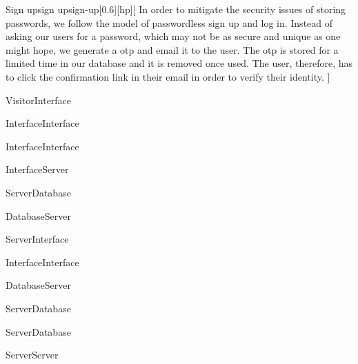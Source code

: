 \begin{sdfig}{Sign up}{sign up}{sign-up}[0.6][hp][
    In order to mitigate the security issues of storing passwords, we follow the model of passwordless sign up and log in.
    Instead of asking our users for a password, which may not be as secure and unique as one might hope, we generate a \acrfull{otp} and email it to the user.
    The \acrshort{otp} is stored for a limited time in our database and it is removed once used.
    The user, therefore, has to click the confirmation link in their email in order to verify their identity.
  ]

  \begin{umlcall}[op={Sign up}]{Visitor}{Interface}
    \begin{umlcall}[op={Validate}]{Interface}{Interface}
      \begin{umlfragment}[type=alt, label=valid]
        \begin{umlcall}[op={Set loading}]{Interface}{Interface}
          \begin{umlcall}[op={Sign up}]{Interface}{Server}
            \begin{umlcall}[op={Has user}]{Server}{Database}
              \begin{umlfragment}[type=alt, label=true]
                \begin{umlcall}[type=return,op={Yes}]{Database}{Server}
                  \begin{umlcall}[type=return,op={Error}]{Server}{Interface}
                    \begin{umlcall}[op={Show error}]{Interface}{Interface}
                    \end{umlcall}
                  \end{umlcall}
                \end{umlcall}
                \umlfpart[else]
                \begin{umlcall}[type=return,op={No}]{Database}{Server}
                  \begin{umlcall}[op={Create user}]{Server}{Database}
                  \end{umlcall}
                  \begin{umlcall}[op={Create OTP}]{Server}{Database}
                    \begin{umlcall}[op={Send email}]{Server}{Server}

\end{umlcall}
\end{umlcall}
\end{umlcall}
\end{umlfragment}
\end{umlcall}
\end{umlcall}
\end{umlcall}
\end{umlfragment}
\end{umlcall}
\end{umlcall}
\end{sdfig}
